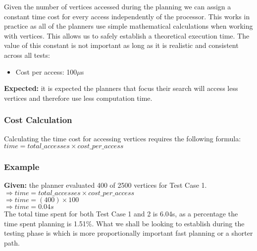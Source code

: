 \noindent
Given the number of vertices accessed during the planning we can assign a constant time cost for every access independently of the processor. This works in practice as all of the planners use simple mathematical calculations when working with vertices. This allows us to safely establish a theoretical execution time. The value of this constant is not important as long as it is realistic and consistent across all tests:

\begin{itemize}
\item Cost per access: 100$\mu$s
\end{itemize}   

\noindent
\textbf{Expected:} it is expected the planners that focus their search will access less vertices and therefore use less computation time.

\subsubsection{Cost Calculation}

\noindent
Calculating the time cost for accessing vertices requires the following formula: \\

\indent $time = total\_accesses \times cost\_per\_access$

\subsubsection{Example}

\noindent
\textbf{Given:} the planner evaluated 400 of 2500 vertices for Test Case 1. \\

\indent $\Rightarrow time = total\_accesses \times cost\_per\_access$ \\
\indent $\Rightarrow time = (400) \times 100$ \\
\indent $\Rightarrow time = 0.04s$ \\

\noindent
The total time spent for both Test Case 1 and 2 is 6.04s, as a percentage the time spent planning is 1.51\%.  What we shall be looking to establish during the testing phase is which is more proportionally important fast planning or a shorter path.